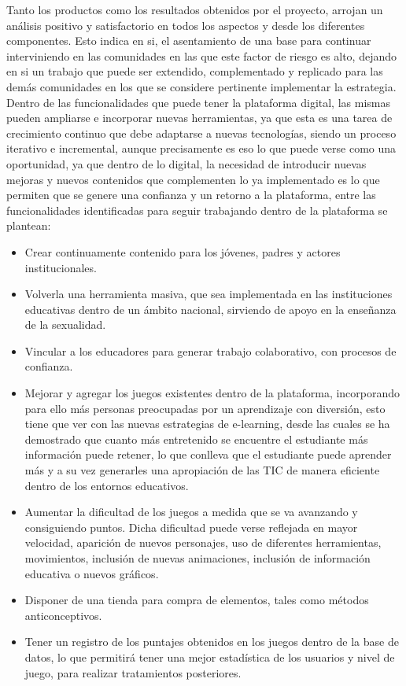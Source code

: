 \documentclass[journal,transmag]{IEEEtran}
\begin{document}
Tanto los productos como los resultados obtenidos por el proyecto, arrojan un análisis positivo y satisfactorio en todos los aspectos y desde los diferentes componentes. Esto indica en si, el asentamiento de una base para continuar interviniendo en las comunidades en las que este factor de riesgo es alto, dejando en si un trabajo que puede ser extendido, complementado y replicado para las demás comunidades en los que se considere pertinente implementar la estrategia. Dentro de las funcionalidades que puede tener la plataforma digital, las mismas pueden ampliarse e incorporar nuevas herramientas, ya que esta es una tarea de crecimiento continuo que debe adaptarse a nuevas tecnologías, siendo un proceso iterativo e incremental, aunque precisamente es eso lo que puede verse como una oportunidad, ya que dentro de lo digital, la necesidad de introducir nuevas mejoras y nuevos contenidos que complementen lo ya implementado es lo que permiten que se genere una confianza y un retorno a la plataforma, entre las funcionalidades identificadas para seguir trabajando dentro de la plataforma se plantean:

\begin{itemize}
\item Crear continuamente contenido para los jóvenes, padres y actores institucionales.
\item Volverla una herramienta masiva, que sea implementada en las instituciones educativas dentro de un ámbito nacional, sirviendo de apoyo en la enseñanza de la sexualidad.
\item Vincular a los educadores para generar trabajo colaborativo, con procesos de confianza.
\item Mejorar y agregar los juegos existentes dentro de la plataforma, incorporando para ello más personas preocupadas por un aprendizaje con diversión, esto tiene que ver con las nuevas estrategias de e-learning, desde las cuales se ha demostrado que cuanto más entretenido se encuentre el estudiante más información puede retener, lo que conlleva que el estudiante puede aprender más y a su vez generarles una apropiación de las TIC de manera eficiente dentro de los entornos educativos.
\item Aumentar la dificultad de los juegos a medida que se va avanzando y consiguiendo puntos. Dicha dificultad puede verse reflejada en mayor velocidad, aparición de nuevos personajes, uso de diferentes herramientas, movimientos, inclusión de nuevas animaciones, inclusión de información educativa o nuevos gráficos.
\item Disponer de una tienda para compra de elementos, tales como métodos anticonceptivos.
\item Tener un registro de los puntajes obtenidos en los juegos dentro de la base de datos, lo que permitirá tener una mejor estadística de los usuarios y nivel de juego, para realizar tratamientos posteriores.
\end{itemize}



\end{document}
